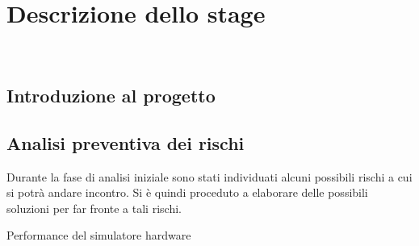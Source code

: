 
\chapter{Descrizione dello stage}
\label{cap:descrizione-stage}

\\

\section{Introduzione al progetto}

\section{Analisi preventiva dei rischi}

Durante la fase di analisi iniziale sono stati individuati alcuni possibili rischi a cui si potrà andare incontro.
Si è quindi proceduto a elaborare delle possibili soluzioni per far fronte a tali rischi.\\

\begin{risk}{Performance del simulatore hardware}
    \label{risk:hardware-simulator} 
\end{risk}

